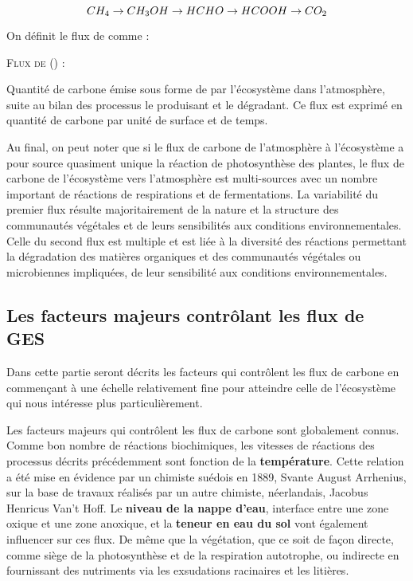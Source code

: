 $$
CH_{4} \rightarrow CH_{3}OH \rightarrow HCHO \rightarrow HCOOH \rightarrow CO_{2} \\
$$

On définit le flux de \chh comme : 
\begin{pdef}
\textsc{Flux de \chh (\fchh)} :

Quantité de carbone émise sous forme de \chh par l'écosystème dans l'atmosphère, suite au bilan des processus le produisant et le dégradant.
Ce flux est exprimé en quantité de carbone par unité de surface et de temps.
\end{pdef}




Au final, on peut noter que si le flux de carbone de l'atmosphère à l'écosystème a pour source quasiment unique la réaction de photosynthèse des plantes, le flux de carbone de l'écosystème vers l'atmosphère est multi-sources avec un nombre important de réactions de respirations et de fermentations.
La variabilité du premier flux résulte majoritairement de la nature et la structure des communautés végétales et de leurs sensibilités aux conditions environnementales.
Celle du second flux est multiple et est liée à la diversité des réactions permettant la dégradation des matières organiques et des communautés végétales ou microbiennes impliquées, de leur sensibilité aux conditions environnementales.

\subsection{Les facteurs majeurs contrôlant les flux de GES}

Dans cette partie seront décrits les facteurs qui contrôlent les flux de carbone en commençant à une échelle relativement fine pour atteindre celle de l'écosystème qui nous intéresse plus particulièrement.

Les facteurs majeurs qui contrôlent les flux de carbone sont globalement connus.
Comme bon nombre de réactions biochimiques, les vitesses de réactions des processus décrits précédemment sont fonction de la \textbf{température}.
Cette relation  a été mise en évidence par un chimiste suédois en 1889, Svante August Arrhenius, sur la base de travaux réalisés par un autre chimiste, néerlandais, Jacobus Henricus Van't Hoff.
Le \textbf{niveau de la nappe d'eau}, interface entre une zone oxique et une zone anoxique, et la \textbf{teneur en eau du sol} vont également influencer sur ces flux.
De même que la végétation, que ce soit de façon directe, comme siège de la photosynthèse et de la respiration autotrophe, ou indirecte en fournissant des nutriments via les exsudations racinaires et les litières.


